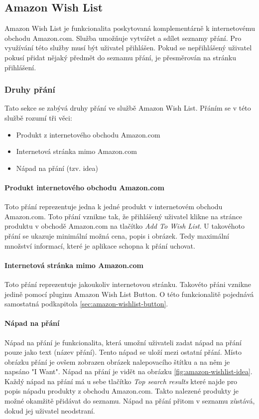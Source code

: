 \subsection{Amazon Wish List}
Amazon Wish List je funkcionalita poskytovaná komplementárně k internetovému obchodu Amazon.com. Služba umožňuje vytvářet a sdílet seznamy přání. Pro využívání této služby musí být uživatel přihlášen. Pokud se nepřihlášený uživatel pokusí přidat nějaký předmět do seznamu přání, je přesměrován na stránku přihlášení.

\subsubsection{Druhy přání}
Tato sekce se zabývá druhy přání ve službě Amazon Wish List. Přáním se v této službě rozumí tři věci:
\begin{itemize}
\item Produkt z internetového obchodu Amazon.com
\item Internetová stránka mimo Amazon.com
\item Nápad na přání (tzv. idea)
\end{itemize}

\paragraph{Produkt internetového obchodu Amazon.com}
\label{par:produkt-amazon}
Toto přání reprezentuje jedna k jedné produkt v internetovém obchodu Amazon.com. Toto přání vznikne tak, že přihlášený uživatel klikne na stránce produktu v obchodě Amazon.com na tlačítko \emph{Add To Wish List}. U takovéhoto přání se ukazuje minimální možná cena, popis i obrázek. Tedy maximální množství informací, které je aplikace schopna k přání uchovat.

\paragraph{Internetová stránka mimo Amazon.com}
Toto přání reprezentuje jakoukoliv internetovou stránku. Takovéto přáni vznikne jedině pomocí pluginu Amazon Wish List Button. O této funkcionalitě pojednává samostatná podkapitola \ref{sec:amazon-wishlist-button}.

\paragraph{Nápad na přání}
Nápad na přání je funkcionalita, která umožní uživateli zadat nápad na přání pouze jako text (název přání). Tento nápad se uloží mezi ostatní přání. Místo obrázku přání je ovšem zobrazen obrázek nalepovacího štítku a na něm je napsáno "I Want". Nápad na přání je vidět na obrázku \ref{fig:amazon-wishlist-idea}. Každý nápad na přání má u sebe tlačítko \emph{Top search results} které najde pro popis nápadu produkty z obchodu Amazon.com. Takto nalezené produkty je možné okamžitě přidávat do seznamu. Nápad na přání přitom v seznamu zůstává, dokud jej uživatel neodstraní.

